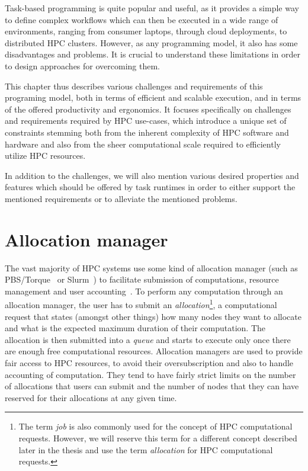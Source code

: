 Task-based programming is quite popular and useful, as it provides a simple way to define complex
workflows which can then be executed in a wide range of environments, ranging from consumer
laptops, through cloud deployments, to distributed HPC clusters. However, as any programming model,
it also has some disadvantages and problems. It is crucial to understand these limitations in order
to design approaches for overcoming them.

This chapter thus describes various challenges and requirements of this programing model, both in
terms of efficient and scalable execution, and in terms of the offered productivity and ergonomics.
It focuses specifically on challenges and requirements required by HPC use-cases, which introduce a
unique set of constraints stemming both from the inherent complexity of HPC software and hardware
and also from the sheer computational scale required to efficiently utilize HPC resources.

In addition to the challenges, we will also mention various desired properties and features which
should be offered by task runtimes in order to either support the mentioned requirements or to
alleviate the mentioned problems.

\section{Allocation manager}
The vast majority of HPC systems use some kind of allocation manager (such as
PBS\slash{}Torque~\cite{pbs} or Slurm~\cite{slurm}) to
facilitate submission of computations, resource management and user
accounting~\cite{slurm-schedmd}. To perform any computation through an allocation manager, the
user has to submit an \emph{allocation}\footnote{The term \emph{job} is also commonly used for the concept of HPC computational
requests. However, we will reserve this term for a different concept described later in the thesis and use the term
\emph{allocation} for HPC computational requests.}, a computational request
that states (amongst other things) how many nodes they want to allocate and what is the expected
maximum duration of their computation. The allocation is then submitted into a
\emph{queue} and starts to execute only once there are enough free computational
resources. Allocation managers are used to provide fair access to HPC resources, to avoid their
oversubscription and also to handle accounting of computation. They tend to have fairly strict
limits on the number of allocations that users can submit and the number of nodes that they can
have reserved for their allocations at any given time.

